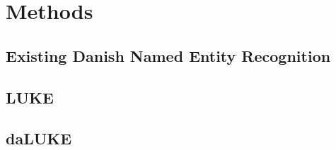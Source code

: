 \documentclass[main.tex]{subfiles}
\begin{document}
\chapter{Methods}

\section{Existing Danish Named Entity Recognition}

\section{LUKE}

\section{daLUKE}
\end{document}
